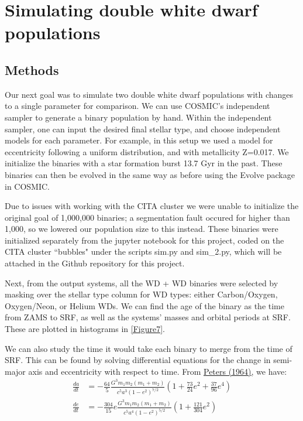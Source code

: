 \documentclass[12pt]{article}
\begin{document}
\section{Simulating double white dwarf populations}
\subsection{Methods}

Our next goal was to simulate two double white dwarf populations with changes to a single parameter for comparison. We can use COSMIC's independent sampler to generate a binary population by hand. Within the independent sampler, one can input the desired final stellar type, and choose independent models for each parameter. For example, in this setup we used a model for eccentricity following a uniform distribution, and with metallicity Z=0.017. We initialize the binaries with a star formation burst 13.7 Gyr in the past. These binaries can then be evolved in the same way as before using the Evolve package in COSMIC. 

Due to issues with working with the CITA cluster we were unable to initialize the original goal of 1,000,000 binaries; a segmentation fault occured for higher than 1,000, so we lowered our population size to this instead. These binaries were initialized separately from the jupyter notebook for this project, coded on the CITA cluster ``bubbles" under the scripts sim.py and sim\_2.py, which will be attached in the Github repository for this project.

Next, from the output systems, all the WD + WD binaries were selected by masking over the stellar type column for WD types: either Carbon/Oxygen, Oxygen/Neon, or Helium WDs. We can find the age of the binary as the time from ZAMS to SRF, as well as the systems' masses and orbital periods at SRF. These are plotted in histograms in \autoref{Figure7}. 

We can also study the time it would take each binary to merge from the time of SRF. This can be found by solving differential equations for the change in semi-major axis and eccentricity with respect to time. From \href{https://ui.adsabs.harvard.edu/abs/1964PhRv..136.1224P/abstract}{\color{blue}\uline{Peters (1964)}}, we have:
\begin{align}
    \frac{da}{dt} &= -\frac{64}{5}\frac{G^3m_1m_2(m_1+m_2)}{c^5a^3(1-e^2)^{7/2}}\left(1+\frac{73}{24}e^2+\frac{37}{96}e^4\right) \label{Eq1} \\
    \frac{de}{dt} &= -\frac{304}{15}e\frac{G^3m_1m_2(m_1+m_2)}{c^5a^4(1-e^2)^{5/2}}\left(1+\frac{121}{304}e^2\right)
\end{align}
\end{document}

